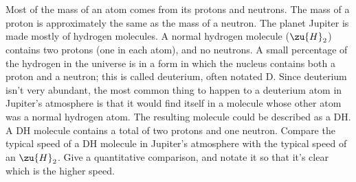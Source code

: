 Most of the mass of an atom comes from its protons and neutrons. The mass of a proton is
approximately the same as the mass of a neutron. The planet Jupiter is made mostly of hydrogen
molecules.                                                                                                                                                    
A normal hydrogen molecule ($\zu{H}_2$) contains two protons (one in each atom), and no neutrons.
A small percentage of the hydrogen in the universe is in a form in which the nucleus contains
both a proton and a neutron; this is called deuterium, often notated D. Since deuterium isn't very abundant,
the most common thing to happen to a deuterium atom in Jupiter's atmosphere is that it would
find itself in a molecule whose other atom was a normal hydrogen atom. The resulting molecule
could be described as a DH. A DH molecule contains a total of two protons and one neutron.
Compare the typical speed of a DH molecule in Jupiter's atmosphere with the typical speed of
an $\zu{H}_2$. Give a quantitative comparison, and notate it so that it's clear which is the higher
speed.
